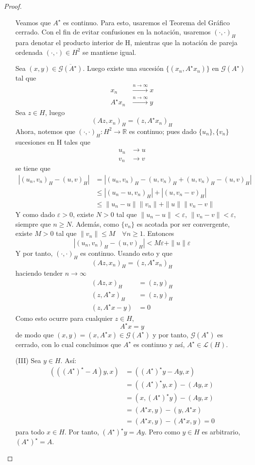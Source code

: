 \begin{proof}
\begin{enumerate}
Veamos que $A^\star$ es continuo.
Para esto, usaremos el Teorema del Gráfico cerrado. Con el fin de evitar confusiones en la notación, usaremos $(\cdot,\cdot)_H$ para denotar el producto interior de H, mientras que la notación de pareja ordenada $(\cdot,\cdot) \in H^2$ se mantiene igual.

Sea $(x,y) \in \overline{\mathcal{G}(A^\star)}$. Luego existe una sucesión $\{ (x_n, A^\star x_n) \}$ en $\mathcal{G}(A^\star)$ tal que
\begin{align*}
x_n &\xrightarrow{n \to \infty} x \\
A^\star x_n &\xrightarrow{n \to \infty} y
\end{align*}
Sea $z \in H$, luego
\[
(Az,x_n)_H = (z, A^\star x_n)_H
\]
Ahora, notemos que $(\cdot,\cdot)_H: H^2 \longrightarrow \mathbb{R}$ es continuo; pues dado $\{u_n\}, \{v_n\}$ sucesiones en H tales que
\begin{align*}
u_n &\longrightarrow u \\
v_n &\longrightarrow v
\end{align*}
se tiene que
\begin{align*}
|(u_n, v_n)_H - (u, v)_H| &= |(u_n, v_n)_H - (u, v_n)_H + (u, v_n)_H - (u, v)_H| \\
&\le |(u_n - u, v_n)_H| + |(u, v_n - v)_H| \\
&\le \|u_n - u\| \|v_n\| + \|u\| \|v_n - v\|
\end{align*}
Y como dado $\varepsilon>0$, existe $N>0$ tal que $\|u_n - u\| < \varepsilon$, $\|v_n - v\| < \varepsilon$, siempre que $n\geq N$.
Además, como $\{v_n\}$ es acotada por ser convergente, existe $M>0$ tal que $\|v_n\| \le M \quad \forall n \ge 1$. Entonces
\[
|(u_n, v_n)_H - (u, v)_H| < M\varepsilon + \|u\|\varepsilon
\]
Y por tanto, $(\cdot,\cdot)_H$ es continuo.
Usando esto y que
\[
(Az, x_n)_H = (z, A^\star x_n)_H
\]
haciendo tender $n \to \infty$
\begin{align*}
(Az, x)_H &= (z, y)_H \\
(z, A^\star x)_H &= (z, y)_H \\
(z, A^\star x - y) &= 0
\end{align*}
Como esto ocurre para cualquier $z \in H$,
\[
A^\star x = y
\]
de modo que $(x,y)=(x, A^\star x) \in \mathcal{G}(A^\star)$ y por tanto, $\mathcal{G}(A^\star)$ es cerrado, con lo cual concluimos que $A^\star$ es continuo y así, $A^\star \in \mathcal{L}(H)$.
\item[(III)] Sea $y \in H$. Así:
\begin{align*}
(((A^\star)^\star - A)y, x) &= ((A^\star)^\star y - Ay, x) \\
&= ((A^\star)^\star y, x) - (Ay, x) \\
&= (x, (A^\star)^\star y) - (Ay, x) \\
&= (A^{\star}x, y) - (y, A^{\star}x) \\
&= (A^\star x, y) - (A^{\star}x, y)=0
\end{align*}
para todo $x \in H$. Por tanto, $(A^\star)^\star y = Ay$. Pero como $y \in H$ es arbitrario, $\displaystyle(A^\star)^\star = A$.


\end{enumerate}
\end{proof}
